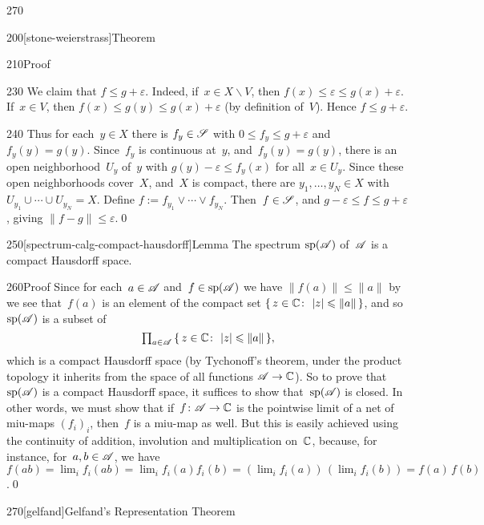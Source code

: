 \begin{parsec}{270}
\begin{point}{200}[stone-weierstrass]{Theorem}
\begin{point}{210}{Proof}
\begin{point}{230}
We claim that $f\leq g+\varepsilon$.
Indeed,
if~$x\in X\backslash V$,
then $f(x)\leq \varepsilon\leq g(x)+\varepsilon$.
If~$x\in V$,
then $f(x)\leq g(y)\leq g(x)+\varepsilon$
(by definition of~$V$).
Hence $f\leq g+\varepsilon$.
\end{point}
\begin{point}{240}%
Thus for each~$y\in X$
there is $f_y\in \mathscr{S}$ with $0\leq f_y \leq g+\varepsilon$
and~$f_y(y)=g(y)$.
Since~$f_y$ is continuous at~$y$,
and~$f_y(y)=g(y)$,
there is an open neighborhood~$U_y$ of~$y$
with $g(y)-\varepsilon\leq f_y(x)$
for all~$x\in U_y$.
Since these open neighborhoods cover~$X$,
and~$X$ is compact,
there are $y_1,\dotsc,y_N\in X$
with $U_{y_1}\cup\dotsb\cup U_{y_N} = X$.
Define $f:=f_{y_1}\vee \dotsb\vee f_{y_N}$.
Then~$f\in\mathscr{S}$,
and $g-\varepsilon \leq f\leq g+\varepsilon$,
giving $\|f-g\|\leq \varepsilon$.\qed
\end{point}
\end{point}
\end{point}
\begin{point}{250}[spectrum-calg-compact-hausdorff]{Lemma}%
The spectrum $\mathrm{sp}(\mathscr{A})$ of~$\mathscr{A}$ is a compact Hausdorff space.
\begin{point}{260}{Proof}%
Since for each~$a\in \mathscr{A}$
and~$f\in \mathrm{sp}(\mathscr{A})$
we have  $\|f(a)\|\leq \|a\|$ 
by~
we see that~$f(a)$ is an element of the compact set
$\{\,z\in \mathbb{C}\colon\, \left|z\right|\leqslant\|a\|\,\}$,
and so~$\mathrm{sp}(\mathscr{A})$ is a subset of
\begin{equation*}
\textstyle
\prod_{a\in \mathscr{A}}\, \{\,z\in \mathbb{C}\colon\, \left|z\right|\leqslant \|a\|\,\},
\end{equation*}
which is a compact Hausdorff space
(by Tychonoff's theorem, under the product topology
it inherits
from the space of all functions $\mathscr{A}\to \mathbb{C}$).
So to prove that~$\mathrm{sp}(\mathscr{A})$
is a compact Hausdorff space,
it suffices to show that~$\mathrm{sp}(\mathscr{A})$
is closed.
In other words,
we must show that if~$f\colon \mathscr{A}\to \mathbb{C}$
is the pointwise limit of a net of miu-maps $(f_i)_i$,
then~$f$ is a miu-map as well.
But this is easily achieved
using the continuity of addition, involution and multiplication on~$\mathbb{C}$,
because, for instance, 
for~$a,b\in\mathscr{A}$, we have $f(ab)
= \lim_i f_i(ab)=\lim_i f_i(a)f_i(b)
 = (\lim_i f_i(a))\,(\lim_i f_i(b))
= f(a) \,f(b)$.\qed
\end{point}
\end{point}
\begin{point}{270}[gelfand]{Gelfand's Representation Theorem}%
%

\end{point}
\end{parsec}
